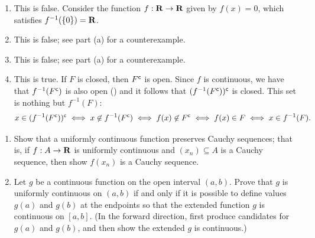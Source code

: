 \documentclass{lew98_solutions}
\begin{document}
\begin{solution}
    \begin{enumerate}
        \item This is false. Consider the function \( f : \mathbf{R} \to \mathbf{R} \) given by \( f(x) = 0 \), which satisfies \( f^{-1}(\{ 0 \}) = \mathbf{R} \).

        \item This is false; see part (a) for a counterexample.

        \item This is false; see part (a) for a counterexample.

        \item This is true. If \( F \) is closed, then \( F^{\mathsf{c}} \) is open. Since \( f \) is continuous, we have that \( f^{-1}(F^{\mathsf{c}}) \) is also open () and it follows that \( (f^{-1}(F^{\mathsf{c}}))^{\mathsf{c}} \) is closed. This set is nothing but \( f^{-1}(F) \):
        \[
            x \in (f^{-1}(F^{\mathsf{c}}))^{\mathsf{c}} \iff x \not\in f^{-1}(F^{\mathsf{c}}) \iff f(x) \not\in F^{\mathsf{c}} \iff f(x) \in F \iff x \in f^{-1}(F).
        \]
    \end{enumerate}
\end{solution}

\begin{exercise}
\label{ex:4.4.13}
    \begin{enumerate}
        \item Show that a uniformly continuous function preserves Cauchy sequences; that is, if \( f : A \to \mathbf{R} \) is uniformly continuous and \( (x_n) \subseteq A \) is a Cauchy sequence, then show \( f(x_n) \) is a Cauchy sequence.

        \item Let \( g \) be a continuous function on the open interval \( (a, b) \). Prove that \( g \) is uniformly continuous on \( (a, b) \) if and only if it is possible to define values \( g(a) \) and \( g(b) \) at the endpoints so that the extended function \( g \) is continuous on \( [a, b] \). (In the forward direction, first produce candidates for \( g(a) \) and \( g(b) \), and then show the extended \( g \) is continuous.)
    \end{enumerate}
\end{exercise}
\end{document}

